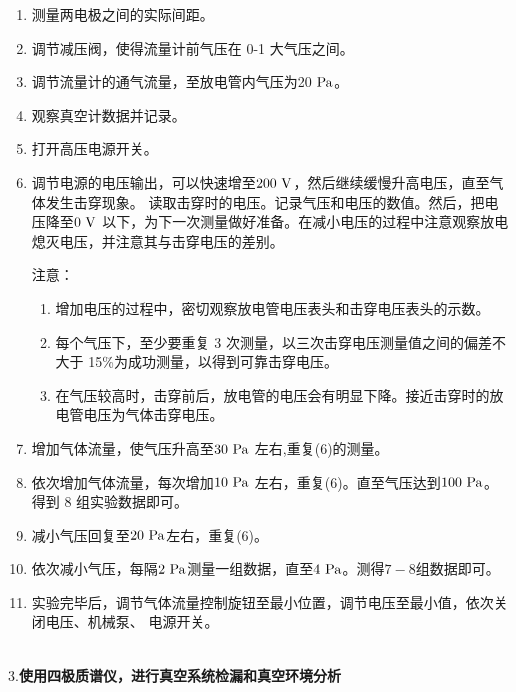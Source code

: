 \documentclass[11pt,a4paper]{ctexart}
\newcommand{\unit}[1]{\rm \ #1}
\newcommand{\emptyline}{\par \ }
\begin{document}
\begin{enumerate}
\item 测量两电极之间的实际间距。
\item 调节减压阀，使得流量计前气压在 0-1 大气压之间。
\item 调节流量计的通气流量，至放电管内气压为20$\unit{Pa}$。
\item 观察真空计数据并记录。
\item 打开高压电源开关。
\item 调节电源的电压输出，可以快速增至$200\unit{V}$，然后继续缓慢升高电压，直至气体发生击穿现象。
读取击穿时的电压。记录气压和电压的数值。然后，把电压降至$0\unit{V}$ 以下，为下一次测量做好准备。在减小电压的过程中注意观察放电熄灭电压，并注意其与击穿电压的差别。
\par
注意：
\begin{enumerate}
\item 增加电压的过程中，密切观察放电管电压表头和击穿电压表头的示数。
\item 每个气压下，至少要重复 3 次测量，以三次击穿电压测量值之间的偏差不大于 15\%为成功测量，以得到可靠击穿电压。
\item 在气压较高时，击穿前后，放电管的电压会有明显下降。接近击穿时的放电管电压为气体击穿电压。
\end{enumerate}
\item 增加气体流量，使气压升高至$30\unit{Pa}$ 左右,重复(6)的测量。
\item 依次增加气体流量，每次增加$10\unit{Pa}$ 左右，重复(6)。直至气压达到$100\unit{Pa}$。得到 8 组实验数据即可。
\item 减小气压回复至$20\unit{Pa}$左右，重复(6)。
\item 依次减小气压，每隔$2\unit{Pa}$测量一组数据，直至$4\unit{Pa}$。测得$7-8$组数据即可。
\item 实验完毕后，调节气体流量控制旋钮至最小位置，调节电压至最小值，依次关闭电压、机械泵、
电源开关。
\end{enumerate}

\emptyline
\\
3.\textbf{使用四极质谱仪，进行真空系统检漏和真空环境分析}\par
\end{document}
